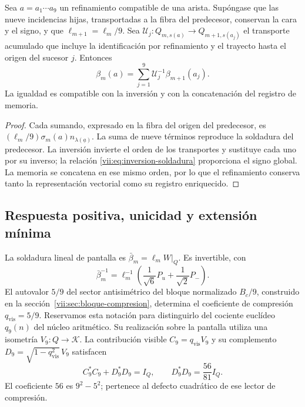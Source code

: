 \begin{proposition}
\label{vii:prop:refinamiento-soldadura}
Sea \(a=a_1\cdots a_9\) un refinamiento compatible de una arista.
Supóngase que las nueve incidencias hijas, transportadas a la fibra del
predecesor, conservan la cara y el signo, y que
\(\ell_{m+1}=\ell_m/9\). Sea
\(\mathcal U_j:Q_{m,s(a)}\longrightarrow Q_{m+1,s(a_j)}\)
el transporte acumulado que incluye la identificación por refinamiento
y el trayecto hasta el origen del sucesor \(j\). Entonces
\[
 \beta_m(a)=
 \sum_{j=1}^{9}\mathcal U_j^{-1}\beta_{m+1}(a_j).
\]
La igualdad es compatible con la inversión y con la concatenación
del registro de memoria.
\end{proposition}

\begin{proof}
Cada sumando, expresado en la fibra del origen del predecesor, es
\((\ell_m/9)\sigma_m(a)n_{\lambda(\underline a)}\).
La suma de nueve términos reproduce la soldadura del predecesor.
La inversión invierte el orden de los transportes y sustituye cada uno
por su inverso; la relación \eqref{vii:eq:inversion-soldadura} proporciona
el signo global. La memoria se concatena en ese mismo orden, por lo
que el refinamiento conserva tanto la representación vectorial como su
registro enriquecido.
\end{proof}

\subsection{Respuesta positiva, unicidad y extensión mínima}
\label{vii:sec:respuesta-positiva}

La soldadura lineal de pantalla es
\(\bar\beta_m=\ell_mW|_Q\). Es invertible, con
\[
 \bar\beta_m^{-1}
 =\ell_m^{-1}\left(\frac1{\sqrt6}P_u+\frac1{\sqrt2}P_-\right).
\]
El autovalor \(5/9\) del sector antisimétrico del bloque normalizado
\(B_c/9\), construido en la sección~\ref{vii:sec:bloque-compresion},
determina el coeficiente de
compresión \(q_{\mathrm{vis}}=5/9\). Reservamos esta notación para
distinguirlo del cociente euclídeo \(q_9(n)\) del núcleo aritmético.
Su realización sobre la pantalla utiliza una isometría
\(V_9:Q\longrightarrow\mathcal K\). La contribución visible
\(C_9=q_{\mathrm{vis}}V_9\) y su complemento
\(D_9=\sqrt{1-q_{\mathrm{vis}}^2}\,V_9\) satisfacen
\[
 C_9^*C_9+D_9^*D_9=I_Q,\qquad D_9^*D_9=\frac{56}{81}I_Q.
\]
El coeficiente \(56\) es \(9^2-5^2\); pertenece al defecto cuadrático
de ese lector de compresión.

